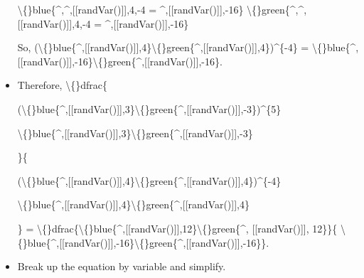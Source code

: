 \documentclass{article}
\begin{document}
\begin{itemize}
                        
                            
                                \textbackslash\{\}blue\{\textasciicircum{},\textasciicircum{},[[randVar()]],4,-4 = \textasciicircum{},[[randVar()]],-16\}
                                \textbackslash\{\}green\{\textasciicircum{},\textasciicircum{},[[randVar()]],4,-4 = \textasciicircum{},[[randVar()]],-16\}
                            
                            So, 
                                (\textbackslash\{\}blue\{\textasciicircum{},[[randVar()]],4\}\textbackslash\{\}green\{\textasciicircum{},[[randVar()]],4\})\textasciicircum{}\{-4\} = 
                                \textbackslash\{\}blue\{\textasciicircum{},[[randVar()]],-16\}\textbackslash\{\}green\{\textasciicircum{},[[randVar()]],-16\}.
  \item Therefore, 
                            \textbackslash\{\}dfrac\{
                            
                                (\textbackslash\{\}blue\{\textasciicircum{},[[randVar()]],3\}\textbackslash\{\}green\{\textasciicircum{},[[randVar()]],-3\})\textasciicircum{}\{5\}
                            
                            
                                \textbackslash\{\}blue\{\textasciicircum{},[[randVar()]],3\}\textbackslash\{\}green\{\textasciicircum{},[[randVar()]],-3\}
                            
                            \}\{
                            
                                (\textbackslash\{\}blue\{\textasciicircum{},[[randVar()]],4\}\textbackslash\{\}green\{\textasciicircum{},[[randVar()]],4\})\textasciicircum{}\{-4\}
                            
                            
                                \textbackslash\{\}blue\{\textasciicircum{},[[randVar()]],4\}\textbackslash\{\}green\{\textasciicircum{},[[randVar()]],4\}
                            
                            \} = \textbackslash\{\}dfrac\{\textbackslash\{\}blue\{\textasciicircum{},[[randVar()]],12\}\textbackslash\{\}green\{\textasciicircum{}, [[randVar()]], 12\}\}\{
                            \textbackslash\{\}blue\{\textasciicircum{},[[randVar()]],-16\}\textbackslash\{\}green\{\textasciicircum{},[[randVar()]],-16\}\}.
  \item Break up the equation by variable and simplify.
                        

\end{itemize}
\end{document}
